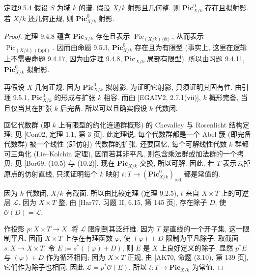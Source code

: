 \begin{origstatement}{定理}{9.5.4}\label{ch09s05:thm9.5.4}
假设 $S$ 为域 $k$ 的谱. 假设 $X/k$ 射影且几何整. 则 $\mathbf{Pic}^0_{X/k}$ 存在且拟射影. 若 $X/k$ 还几何正规, 则 $\mathbf{Pic}^0_{X/k}$ 射影.
\end{origstatement}
\begin{proof}
定理 9.4.8 蕴含 $\mathbf{Pic}_{X/k}$ 存在且表示 $\operatorname{Pic}_{(X/k)\,\text{(\'{e}t)}}$, 从而表示 $\operatorname{Pic}_{(X/k)\,\mathrm{(fppf)}}$. 因而由命题 9.5.3, $\mathbf{Pic}^0_{X/k}$ 存在且为有限型 (事实上, 这里在逻辑上不需要命题 9.4.17, 因为由定理 9.4.8, $\mathbf{Pic}_{X/k}$ 局部有限型). 所以由习题 9.4.11, $\mathbf{Pic}^0_{X/k}$ 拟射影.

再假设 $X$ 几何正规. 因为 $\mathbf{Pic}^0_{X/k}$ 拟射影, 为证明它射影, 只须证明其固有性. 由引理 9.5.1, $\mathbf{Pic}^0_{X/k}$ 的形成与扩张 $k$ 相容. 而由 [EGAIV2, 2.7.1(vii)], $k$ 概形完备, 当且仅当其在扩张 $k$ 后完备. 所以可以且确实假设 $k$ 代数闭.

回忆代数群 (即 $k$ 上有限型的约化连通群概形) 的 Chevalley 与 Rosenlicht 结构定理; 见 [Con02, 定理 1.1, 第 3 页]. 此定理说, 每个代数群都是一个 Abel 簇 (即完备代数群) 被一个线性 (即仿射) 代数群的扩张. 还要回忆, 每个可解线性代数 $k$ 群都可三角化 (Lie--Kolchin 定理), 因而若其非平凡, 则包含乘法群或加法群的一个拷贝; 见 [Bor69, (10.5) 与 (10.2)]. 现在 $\mathbf{Pic}_{X/k}$ 交换, 所以可解. 因此, 若 $T$ 表示去掉原点的仿射直线, 只须证明每个 $k$ 映射 $t:T\to(\mathbf{Pic}^0_{X/k})_{\mathrm{red}}$ 都是常值的.


因为 $k$ 代数闭, $X/k$ 有截面. 所以由比较定理 (定理 9.2.5), $t$ 来自 $X\times T$ 上的可逆层 $\mathcal L$. 因为 $X\times T$ 整, 由 [Har77, 习题 II, 6.15, 第 145 页], 存在除子 $D$, 使 $\mathcal O(D)=\mathcal L$.

作投影 $p:X\times T\to X$. 将 $\mathcal L$ 限制到其泛纤维. 因为 $T$ 是直线的一个开子集, 这一限制平凡. 因而 $X\times T$ 上存在有理函数 $\varphi$, 使 $(\varphi)+D$ 限制为平凡除子. 取截面 $s:X\to X\times T$. 令 $E:=s^*((\varphi)+D)$, 则 $E$ 是 $X$ 上良好定义的除子. 显然 $p^*E$ 与 $(\varphi)+D$ 作为循环相同; 因为 $X\times T$ 正规, 由 [AK70, 命题 (3.10), 第 139 页], 它们作为除子也相同. 因此 $\mathcal L=p^*\mathcal O(E)$. 所以 $t:T\to\mathbf{Pic}_{X/k}$ 为常值.
\end{proof}

